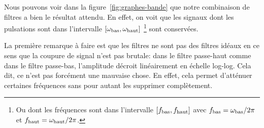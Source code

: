 Nous pouvons voir dans la figure~\ref{fig:graphes-bande}
que notre combinaison de filtres a bien le résultat attendu.
En effet, on voit que les signaux dont les pulsations sont dans l'intervalle
$[\omega_{\mathrm{bas}},\omega_{\mathrm{haut}}]$
\footnote{Ou dont les fréquences sont dans l'intervalle
    $[f_{\mathrm{bas}},f_{\mathrm{haut}}]$ avec
    $f_{\mathrm{bas}} = \omega_{\mathrm{bas}}/2\pi$ et
    $f_{\mathrm{haut}} = \omega_{\mathrm{haut}}/2\pi$.}
sont conservées.

La première remarque à faire est que les filtres ne sont pas des filtres idéaux
en ce sens que la coupure de signal n'est pas brutale:
dans le filtre passe-haut comme dans le filtre passe-bas,
l'amplitude décroit linéairement en échelle log-log.
Cela dit, ce n'est pas forcément une mauvaise chose.
En effet, cela permet d'atténuer certaines fréquences sans pour autant
les supprimer complètement.
